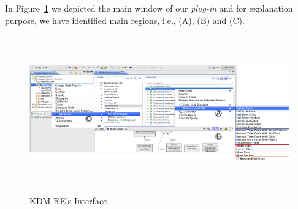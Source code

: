 In Figure~\ref{fig:interface} we depicted the main window of our \textit{plug-in} and for explanation purpose, we have identified main regions, i.e., (A), (B) and (C).

\begin{figure}[!ht]
\centering
  \includegraphics[width=15cm, height=6.8cm]{figure/ScreenShot_tool}
\caption{KDM-RE's Interface}
\label{fig:interface}
\end{figure}